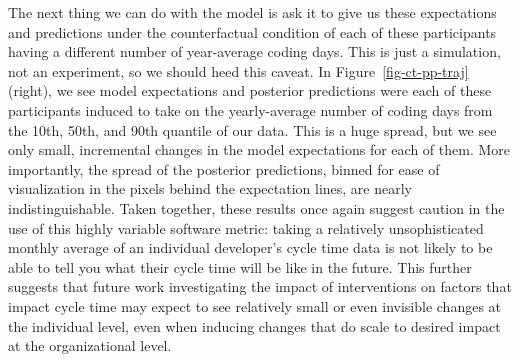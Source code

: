 \documentclass[manuscript,screen,review]{acmart}
\begin{document}
The next thing we can do with the model is ask it to give us these
expectations and predictions under the counterfactual condition of each
of these participants having a different number of year-average coding
days. This is just a simulation, not an experiment, so we should heed
this caveat. In Figure~\ref{fig-ct-pp-traj} (right), we see model
expectations and posterior predictions were each of these participants
induced to take on the yearly-average number of coding days from the
10th, 50th, and 90th quantile of our data. This is a huge spread, but we
see only small, incremental changes in the model expectations for each
of them. More importantly, the spread of the posterior predictions,
binned for ease of visualization in the pixels behind the expectation
lines, are nearly indistinguishable. Taken together, these results once
again suggest caution in the use of this highly variable software
metric: taking a relatively unsophisticated monthly average of an
individual developer's cycle time data is not likely to be able to tell
you what their cycle time will be like in the future. This further
suggests that future work investigating the impact of interventions on
factors that impact cycle time may expect to see relatively small or
even invisible changes at the individual level, even when inducing
changes that do scale to desired impact at the organizational level.
\end{document}
